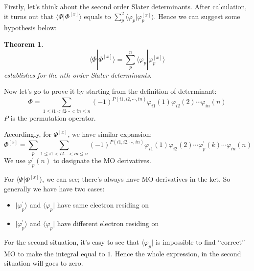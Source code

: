 \documentclass[a4paper,12pt]{article}
\newcommand{\bra}[1]{\langle #1| }
\newcommand{\ket}[1]{|#1 \rangle }
\theoremstyle{definition}\newtheorem{law}{Law}
\theoremstyle{plain}\newtheorem{theorem}{Theorem}
\theoremstyle{remark}\newtheorem{remark}{Remark}
\theoremstyle{axiom}\newtheorem{axiom}{Axiom}
\begin{document}
Firstly, let's think about the second order Slater
determinants. After calculation, it turns out that
$\langle\Phi|\Phi^{[x]}\rangle$ equals to
$\sum_{p}^{2}\langle\varphi_{p}|\varphi^{[x]}_{p}\rangle$. Hence we can suggest
some hypothesis below:
\begin{theorem}
\begin{equation}
\label{eq:8}
 \langle\Phi|\Phi^{[x]}\rangle =
\sum_{p}^{n}\langle\varphi_{p}|\varphi^{[x]}_{p}
\rangle
\end{equation}
establishes for the $nth$ order Slater determinants.
\end{theorem}

Now let's go to prove it by starting from the definition of determinant:
\begin{equation}
 \label{eq:4}
\Phi = \sum_{1\leq i1<i2\cdots<in\leq n}(-1)^{P( i1, i2, \cdots,
in)}\varphi_{i1}(1)\varphi_{i2}(2)\cdots\varphi_{in}(n)
\end{equation}
$P$ is the permutation operator.

Accordingly, for $\Phi^{[x]}$, we have similar expansion:
\begin{equation}
 \label{eq:5}
\Phi^{[x]} = \sum_{p}\sum_{1\leq i1<i2\cdots<in\leq n}(-1)^{P( i1, i2, \cdots,
in)}\varphi_{i1}(1)\varphi_{i2}(2)\cdots\varphi_{p}^{'}(k)\cdots\varphi_{in}(n)
\end{equation} 
We use $\varphi_{p}^{'}(n)$ to designate the MO derivatives.

For $\langle\Phi|\Phi^{[x]}\rangle$, we can see; there's always have MO
derivatives in the ket. So generally we have have two cases:
\begin{itemize}
 \item $\ket{\varphi_{p}^{'}}$ and $\bra{\varphi_{p}}$ have same electron
residing on
 \item $\ket{\varphi_{p}^{'}}$ and $\bra{\varphi_{p}}$ have different electron
residing on
\end{itemize}
For the second situation, it's easy to see that $\bra{\varphi_{p}}$ is
impossible to find ``correct'' MO to make the integral equal to $1$. Hence the
whole expression, in the second situation will goes to zero.
\end{document}
